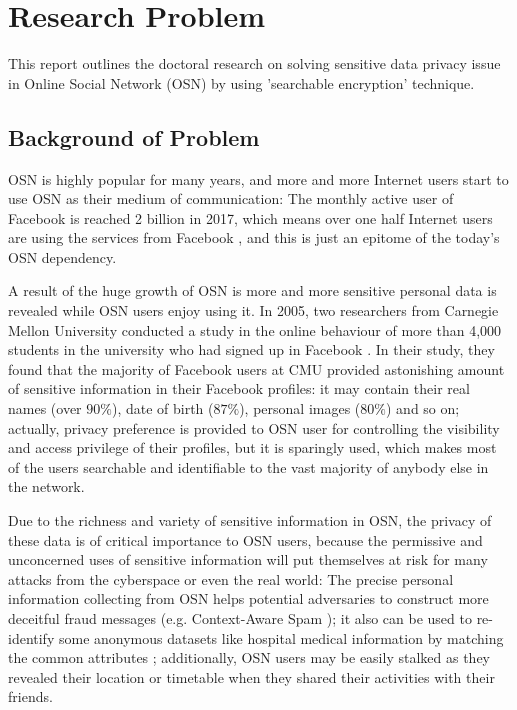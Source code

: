 \chapter{Research Problem}
This report outlines the doctoral research on solving sensitive data privacy issue in Online Social Network (OSN) by using 'searchable encryption' technique. 

\section{Background of Problem}
OSN is highly popular for many years, and more and more Internet users start to use OSN as their medium of communication: The monthly active user of Facebook is reached 2 billion in 2017, which means over one half Internet users are using the services from Facebook \cite{statista2017facebook, itstat2017population}, and this is just an epitome of the today's OSN dependency.

A result of the huge growth of OSN is more and more sensitive personal data is revealed while OSN users enjoy using it. In 2005, two researchers from Carnegie Mellon University conducted a study in the online behaviour of more than 4,000 students in the university who had signed up in Facebook \cite{gross2005information}. In their study, they found that the majority of Facebook users at CMU provided astonishing amount of sensitive information in their Facebook profiles: it may contain their real names (over $90\%$), date of birth ($87\%$), personal images ($80\%$) and so on; actually, privacy preference is provided to OSN user for controlling the visibility and access privilege of their profiles, but it is sparingly used, which makes most of the users searchable and identifiable to the vast majority of anybody else in the network. 

Due to the richness and variety of sensitive information in OSN, the privacy of these data is of critical importance to OSN users, because the permissive and unconcerned uses of sensitive information will put themselves at risk for many attacks from the cyberspace or even the real world: The precise personal information collecting from OSN helps potential adversaries to construct more deceitful fraud messages (e.g. Context-Aware Spam \cite{brown2008social}); it also can be used to re-identify some anonymous datasets like hospital medical information by matching the common attributes \cite{sweeney2002k}; additionally, OSN users may be easily stalked as they revealed their location or timetable when they shared their activities with their friends.

